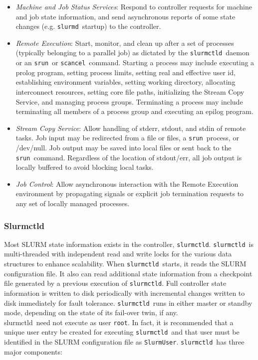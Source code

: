 \documentclass{article}
\newcommand{\srun}{{\tt srun}}
\newcommand{\scancel}{{\tt scancel}}
\newcommand{\slurmctld}{{\tt slurmctld}}
\newcommand{\slurmd}{{\tt slurmd}}
\begin{document}
\begin{itemize}
\item {\em Machine and Job Status Services}:  Respond to controller 
requests for machine and job state information, and send asynchronous 
reports of some state changes (e.g. \slurmd\ startup) to the controller.

\item {\em Remote Execution}: Start, monitor, and clean up after a set
of processes (typically belonging to a parallel job) as dictated by the
\slurmctld\ daemon or an \srun\ or \scancel\ command. Starting a process may
include executing a prolog program, setting process limits, setting real
and effective user id, establishing environment variables, setting working
directory, allocating interconnect resources, setting core file paths,
initializing the Stream Copy Service, and managing
process groups. Terminating a process may include terminating all members
of a process group and executing an epilog program.

\item {\em Stream Copy Service}: Allow handling of stderr, stdout, and
stdin of remote tasks. Job input may be redirected from a file or files, a
\srun\ process, or /dev/null.  Job output may be saved into local files or
sent back to the \srun\ command. Regardless of the location of stdout/err,
all job output is locally buffered to avoid blocking local tasks.

\item {\em Job Control}: Allow asynchronous interaction with the
Remote Execution environment by propagating signals or explicit job
termination requests to any set of locally managed processes.

\end{itemize}

\subsubsection{Slurmctld}

Most SLURM state information exists in the controller, {\tt slurmctld}.
\slurmctld\ is multi-threaded with independent read and write locks 
for the various data structures to enhance scalability. 
When \slurmctld\ starts, it reads the SLURM configuration file.  
It also can read additional state information
from a checkpoint file generated by a previous execution of {\tt slurmctld}.
Full controller state information is written to 
disk periodically with incremental changes written to disk immediately
for fault tolerance.  
\slurmctld\ runs in either master or standby mode, depending on the
state of its fail-over twin, if any.
\\slurmctld\ need not execute as user {\tt root}. 
In fact, it is recommended that a unique user entry be created for 
executing \slurmctld\ and that user must be identified in the SLURM 
configuration file as {\tt SlurmUser}.
\slurmctld\ has three major components:
\end{document}
